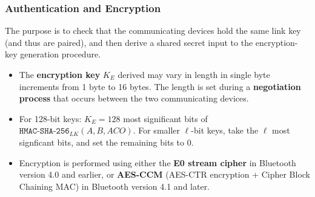 \documentclass[12pt,titlepage]{article}
\begin{document}
\subsubsection{Authentication and Encryption}
The purpose is to check that the communicating devices hold the same link key (and thus are paired), and then derive a shared secret input to the encryption-key generation procedure.

\begin{itemize}
	\item The \textbf{encryption key} $K_E$ derived may vary in length in single byte increments from 1 byte to 16 bytes. The length is set during a \textbf{negotiation process} that occurs between the two communicating devices.
	\item For 128-bit keys: $K_E = 128$ most significant bits of $\texttt{HMAC-SHA-256}_{LK} (A, B, ACO)$. For smaller $\ell$-bit keys, take the $\ell$ most signficant bits, and set the remaining bits to 0.
	\item Encryption is performed using either the \textbf{E0 stream cipher} in Bluetooth version 4.0 and earlier, or \textbf{AES-CCM} (AES-CTR encryption + Cipher Block Chaining MAC) in Bluetooth version 4.1 and later.
\end{itemize}
\end{document}
